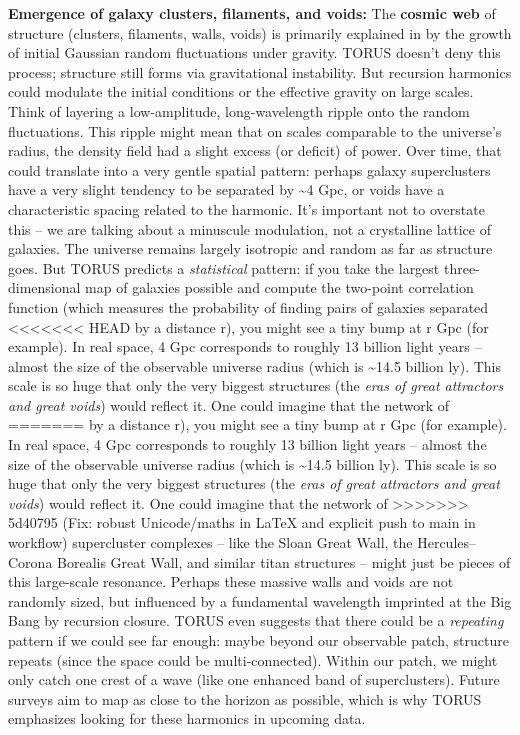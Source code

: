 \documentclass[]{article}
\begin{document}
\textbf{Emergence of galaxy clusters, filaments, and voids:} The
\textbf{cosmic web} of structure (clusters, filaments, walls, voids) is
primarily explained in \LambdaCDM by the growth of initial Gaussian random
fluctuations under gravity. TORUS doesn't deny this process; structure
still forms via gravitational instability. But recursion harmonics could
modulate the initial conditions or the effective gravity on large
scales. Think of layering a low-amplitude, long-wavelength ripple onto
the random fluctuations. This ripple might mean that on scales
comparable to the universe's radius, the density field had a slight
excess (or deficit) of power. Over time, that could translate into a
very gentle spatial pattern: perhaps galaxy superclusters have a very
slight tendency to be separated by \textasciitilde{}4 Gpc, or voids have
a characteristic spacing related to the harmonic. It's important not to
overstate this -- we are talking about a minuscule modulation, not a
crystalline lattice of galaxies. The universe remains largely isotropic
and random as far as structure goes. But TORUS predicts a
\emph{statistical} pattern: if you take the largest three-dimensional
map of galaxies possible and compute the two-point correlation function
(which measures the probability of finding pairs of galaxies separated
<<<<<<< HEAD
by a distance r), you might see a tiny bump at r  Gpc (for
example)\hspace{0pt}. In real space, 4 Gpc corresponds to roughly 13
billion light years -- almost the size of the observable universe radius
(which is \textasciitilde14.5 billion ly). This scale is so huge that
only the very biggest structures (the \emph{eras of great attractors and
great voids}) would reflect it. One could imagine that the network of
=======
by a distance r), you might see a tiny bump at r  Gpc (for example)​.
In real space, 4 Gpc corresponds to roughly 13 billion light years --
almost the size of the observable universe radius (which is
\textasciitilde{}14.5 billion ly). This scale is so huge that only the
very biggest structures (the \emph{eras of great attractors and great
voids}) would reflect it. One could imagine that the network of
>>>>>>> 5d40795 (Fix: robust Unicode/maths in LaTeX and explicit push to main in workflow)
supercluster complexes -- like the Sloan Great Wall, the
Hercules--Corona Borealis Great Wall, and similar titan structures --
might just be pieces of this large-scale resonance. Perhaps these
massive walls and voids are not randomly sized, but influenced by a
fundamental wavelength imprinted at the Big Bang by recursion closure.
TORUS even suggests that there could be a \emph{repeating} pattern if we
could see far enough: maybe beyond our observable patch, structure
repeats (since the space could be multi-connected). Within our patch, we
might only catch one crest of a wave (like one enhanced band of
superclusters). Future surveys aim to map as close to the horizon as
possible, which is why TORUS emphasizes looking for these harmonics in
upcoming data​.
\end{document}
